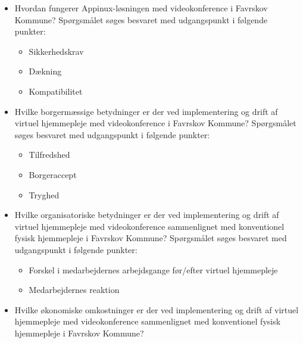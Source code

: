 \begin{itemize}
	\item Hvordan fungerer Appinux-løsningen med videokonference i Favrskov Kommune? Spørgsmålet søges besvaret med udgangspunkt i følgende punkter:
	\begin{itemize}
	\item Sikkerhedskrav
	\item Dækning %
	\item Kompatibilitet 
\end{itemize}
\end{itemize}

\begin{itemize}
	\item Hvilke borgermæssige betydninger er der ved implementering og drift af virtuel hjemmepleje med videokonference i Favrskov Kommune? Spørgsmålet søges besvaret med udgangspunkt i følgende punkter:
	\begin{itemize}
	\item Tilfredshed
	\item Borgeraccept
	\item Tryghed
\end{itemize}
\end{itemize}

\begin{itemize}
	\item Hvilke organisatoriske betydninger er der ved implementering og drift af virtuel hjemmepleje med videokonference sammenlignet med konventionel fysisk hjemmepleje i Favrskov Kommune? Spørgsmålet søges besvaret med udgangspunkt i følgende punkter:
	\begin{itemize}
	\item Forskel i medarbejdernes arbejdsgange før/efter virtuel hjemmepleje
	\item Medarbejdernes reaktion
\end{itemize}
\end{itemize}


\begin{itemize}
	\item Hvilke økonomiske omkostninger er der ved implementering og drift af virtuel hjemmepleje med videokonference sammenlignet med konventionel fysisk hjemmepleje i Favrskov Kommune?
\end{itemize}

